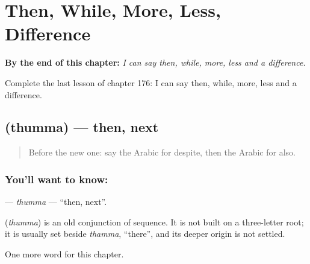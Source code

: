 
\chapter{Then, While, More, Less, Difference}
\label{ch:ar-then-while-more-less-difference}

\begin{chapteropening}
\textbf{By the end of this chapter:} \emph{I can say then, while, more, less and a difference.}

Complete the last lesson of chapter 176: I can say then, while, more, less and a difference.
\end{chapteropening}

\section[\texorpdfstring{\ar{ثم} (thumma)}{ثم (thumma)}]{ (thumma) — then, next}

\label{lesson:AR-C176-thumma}



\begin{quote}
Before the new one: say the Arabic for despite, then the Arabic for also.
\end{quote}

\subsection*{You'll want to know: }
\textbf{} — \emph{thumma} — \textquotedblleft{}then, next\textquotedblright{}.

\begin{cousinweb}
\textbf{} (\emph{thumma}) is an old conjunction of sequence. It is not built on a three-letter root; it is usually set beside \emph{thamma}, \textquotedblleft{}there\textquotedblright{}, and its deeper origin is not settled.
\end{cousinweb}

\begin{grammarlens}[title={What you've built}]
One more word for this chapter.
\end{grammarlens}

